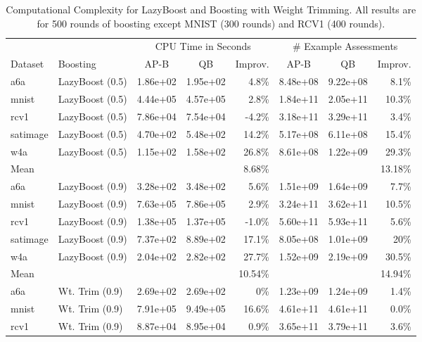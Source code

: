\begin{table}[ht]
\caption{Computational Complexity for LazyBoost and Boosting with Weight Trimming.
All results are for 500 rounds of boosting except MNIST (300 rounds) and RCV1 (400 rounds).}
\label{complexity-approx-results}	
\vskip 0.15in
\begin{center}
\begin{small}
\begin{sc}
\begin{tabular}{llccrccr}
\toprule
& & \multicolumn{3}{c}{CPU Time in Seconds} & \multicolumn{3}{c}{\# Example Assessments} \\
Dataset & Boosting & AP-B & QB & Improv. & AP-B & QB & Improv. \\
\midrule
a6a & LazyBoost (0.5) & 1.86e+02 & 1.95e+02 & 4.8\% & 8.48e+08 & 9.22e+08 & 8.1\%  \\
mnist & LazyBoost (0.5) & 4.44e+05 & 4.57e+05 & 2.8\% & 1.84e+11 & 2.05e+11 & 10.3\% \\
rcv1 & LazyBoost (0.5) & 7.86e+04 & 7.54e+04 & -4.2\% & 3.18e+11 & 3.29e+11 & 3.4\% \\
satimage & LazyBoost (0.5) & 4.70e+02 & 5.48e+02 & 14.2\%  & 5.17e+08 & 6.11e+08 & 15.4\%  \\
w4a & LazyBoost (0.5) & 1.15e+02 & 1.58e+02 & 26.8\% & 8.61e+08 & 1.22e+09 & 29.3\% \\
\midrule
Mean &  & &  & 8.68\% & & & 13.18\% \\
\midrule
a6a & LazyBoost (0.9) & 3.28e+02 & 3.48e+02 & 5.6\%  & 1.51e+09 & 1.64e+09 & 7.7\%  \\
mnist & LazyBoost (0.9) & 7.63e+05 & 7.86e+05 & 2.9\% & 3.24e+11 & 3.62e+11 & 10.5\% \\
rcv1 & LazyBoost (0.9) & 1.38e+05 & 1.37e+05 & -1.0\% & 5.60e+11 & 5.93e+11 & 5.6\% \\
satimage & LazyBoost (0.9) & 7.37e+02 & 8.89e+02 & 17.1\%  & 8.05e+08 & 1.01e+09 & 20\%  \\
w4a & LazyBoost (0.9) & 2.04e+02 & 2.82e+02 & 27.7\% & 1.52e+09 & 2.19e+09 & 30.5\% \\
\midrule
Mean &  & &  & 10.54\% & & & 14.94\% \\
\midrule
a6a & Wt. Trim (0.9) & 2.69e+02 & 2.69e+02 & 0\%  & 1.23e+09 & 1.24e+09 & 1.4\%  \\
mnist & Wt. Trim (0.9) & 7.91e+05 & 9.49e+05 & 16.6\% & 4.61e+11 & 4.61e+11 & 0.0\% \\
rcv1 & Wt. Trim (0.9) & 8.87e+04 & 8.95e+04 & 0.9\%  & 3.65e+11 & 3.79e+11 & 3.6\% \\

\end{tabular}
\end{sc}
\end{small}
\end{center}
\end{table}
